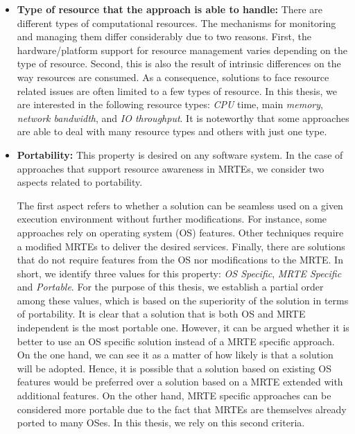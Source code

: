 \begin{itemize}
\item\textbf{Type of resource that the approach is able to handle:}
There are different types of computational resources.
The mechanisms for monitoring and managing them differ considerably due to two reasons.
First, the hardware/platform support for resource management varies depending on the type of resource.
Second, this is also the result of intrinsic differences on the way resources are consumed.
As a consequence, solutions to face resource related issues are often limited to a few types of resource.
In this thesis, we are interested in the following resource types: \textit{CPU} time, main \textit{memory}, \textit{network bandwidth}, and \textit{IO throughput}.
It is noteworthy that some approaches are able to deal with many resource types and others with just one type. 


\item \textbf{Portability:}
This property is desired on any software system.
In the case of approaches that support resource awareness in MRTEs, we consider two aspects related to portability.

The first aspect refers to whether a solution can be seamless used on a given execution environment without further modifications.
For instance, some approaches rely on operating system (OS) features.
Other techniques require a modified MRTEs to deliver the desired services.
Finally, there are solutions that do not require features from the OS nor modifications to the MRTE.
In short, we identify three values for this property: \textit{OS Specific}, \textit{MRTE Specific} and \textit{Portable}.
For the purpose of this thesis, we establish a partial order among these values, which is based on the superiority of the solution in terms of portability.
It is clear that a solution that is both OS and MRTE independent is the most portable one.
However, it can be argued whether it is better to use an OS specific solution instead of a MRTE specific approach.        
On the one hand, we can see it as a matter of how likely is that a solution will be adopted. 
Hence, it is possible that a solution based on existing OS features would be preferred over a solution based on a MRTE extended with additional features.
On the other hand, MRTE specific approaches can be considered more portable due to the fact that MRTEs are themselves already ported to many OSes.
In this thesis, we rely on this second criteria.


\end{itemize}
